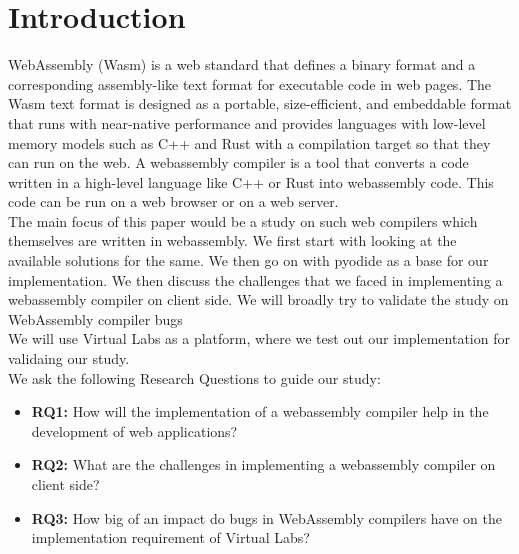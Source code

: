 \section{Introduction}
WebAssembly (Wasm)\cite{wasm} is a web standard that defines a binary format and a corresponding assembly-like text format for executable code in web pages. The Wasm text format is designed as a portable, size-efficient, and embeddable format that runs with near-native performance and provides languages with low-level memory models such as C++ and Rust with a compilation target so that they can run on the web.
A webassembly compiler is a tool that converts a code written in a high-level language like C++ or Rust into webassembly code. This code can be run on a web browser or on a web server. \\
The main focus of this paper would be a study on such web compilers which themselves are written in webassembly. We first start with looking at the available solutions for the same. We then go on with pyodide as a base for our implementation. We then discuss the challenges that we faced in implementing a webassembly compiler on client side. We will broadly try to validate the study on WebAssembly compiler bugs\cite{bugsinwasm} \\
We will use Virtual Labs as a platform, where we test out our implementation for validaing our study. \\
We ask the following Research Questions to guide our study:
\begin{itemize}
    \item \textbf{RQ1:} How will the implementation of a webassembly compiler help in the development of web applications?
    \item \textbf{RQ2:} What are the challenges in implementing a webassembly compiler on client side?
    \item \textbf{RQ3:} How big of an impact do bugs in WebAssembly compilers have on the implementation requirement of Virtual Labs?
\end{itemize}